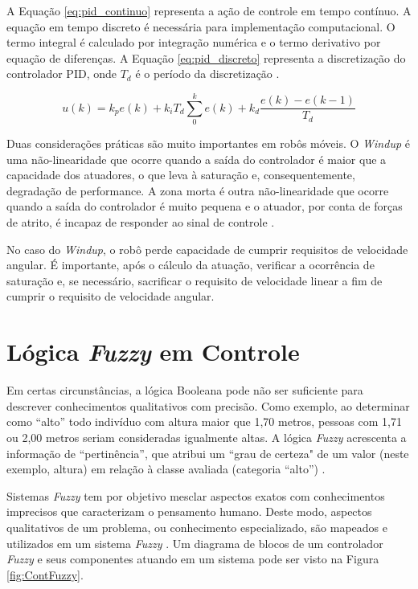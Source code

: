 

A Equação \ref{eq:pid_continuo} representa a ação de controle em tempo contínuo. A equação em
tempo discreto é necessária para implementação computacional. O termo integral é calculado por
integração numérica e o termo derivativo por equação de diferenças. A Equação \ref{eq:pid_discreto} 
representa a discretização do controlador PID, onde $T_d$ é o período da 
discretização \cite{LivroControlePID}.

\begin{equation}
	\label{eq:pid_discreto}	
	u(k) = k_p e(k) + k_i T_d \sum_0^k e(k) + k_d \frac{e(k) - e(k-1)}{T_d}
\end{equation}

Duas considerações práticas são muito importantes em robôs móveis. O \textit{Windup} é uma 
não-linearidade que ocorre quando a saída do controlador é maior que a capacidade dos atuadores,
o que leva à saturação e, consequentemente, degradação de performance. A zona morta é outra 
não-linearidade que ocorre quando a saída do controlador é muito pequena e o atuador, por conta 
de forças de atrito, é incapaz de responder ao sinal de controle \cite{LivroControlePID}.

No caso do \textit{Windup}, o robô perde capacidade de cumprir requisitos de velocidade angular. É 
importante, após o cálculo da atuação, verificar a ocorrência de saturação e, se necessário, 
sacrificar o requisito de velocidade linear a fim de cumprir o requisito de velocidade angular.

\section{Lógica \textit{Fuzzy} em Controle}

Em certas circunstâncias, a lógica Booleana pode não ser suficiente
para descrever conhecimentos qualitativos com precisão. Como exemplo, ao
determinar como ``alto'' todo indivíduo com altura maior que 1,70 metros,
pessoas com 1,71 ou 2,00 metros seriam consideradas igualmente altas.
A lógica \textit{Fuzzy} acrescenta a informação de ``pertinência'', que atribui um
``grau de certeza" de um valor (neste exemplo, altura) em relação à classe
avaliada (categoria ``alto'') \cite{fuzzylilly}.

Sistemas \textit{Fuzzy} tem por objetivo mesclar aspectos exatos com
conhecimentos imprecisos que caracterizam o pensamento humano. Deste modo,
aspectos qualitativos de um problema, ou conhecimento especializado, são
mapeados e utilizados em um sistema \textit{Fuzzy} \cite{fuzzylilly}. Um
diagrama de blocos de um controlador \textit{Fuzzy} e seus componentes atuando
em um sistema pode ser visto na Figura \ref{fig:ContFuzzy}.

